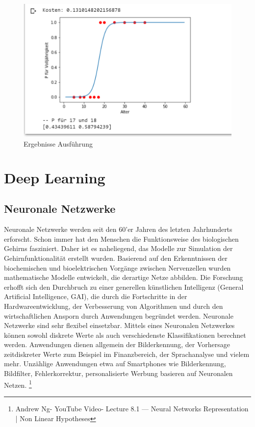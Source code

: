 \documentclass[a4paper]{scrreprt}
\begin{document}
\begin{figure}[hpt]
\centering
\includegraphics[scale=.99]{Abbildungen/Logistische_Regression_Python_2}
\caption{Ergebnisse Ausführung}
\label{figure}
\end{figure}
\chapter{Deep Learning}
\section{Neuronale Netzwerke}
Neuronale Netzwerke werden seit den 60'er Jahren des letzten Jahrhunderts erforscht. Schon immer hat den Menschen die Funktionsweise des biologischen Gehirns fasziniert. Daher ist es naheliegend, das Modelle zur Simulation der Gehirnfunktionalität erstellt wurden. Basierend auf den Erkenntnissen der biochemischen und bioelektrischen Vorgänge zwischen Nervenzellen wurden mathematische Modelle entwickelt, die derartige Netze abbilden. Die Forschung erhofft sich den Durchbruch zu einer generellen künstlichen Intelligenz (General Artificial Intelligence, GAI), die durch die Fortschritte in der Hardwareentwicklung, der Verbesserung von Algorithmen und durch den wirtschaftlichen Ansporn durch Anwendungen begründet werden. Neuronale Netzwerke sind sehr flexibel einsetzbar. Mittels eines Neuronalen Netzwerkes können sowohl diskrete Werte als auch verschiedenste Klassifikationen berechnet werden. Anwendungen dienen allgemein der Bilderkennung, der Vorhersage zeitdiskreter Werte zum Beispiel im Finanzbereich, der Sprachanalyse und vielem mehr. Unzählige Anwendungen etwa auf Smartphones wie Bilderkennung, Bildfilter, Fehlerkorrektur, personalisierte Werbung basieren auf Neuronalen Netzen.
\footnote{Andrew Ng- YouTube Video- Lecture 8.1 — Neural Networks Representation | Non Linear Hypotheses}
\newpage
\end{document}
